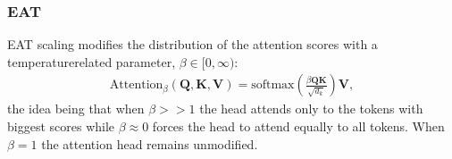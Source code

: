 \documentclass[letterpaper,10pt,english]{sphinxmanual}
\begin{document}
\subsubsection{EAT}
\label{\detokenize{algorithms_intraprocessors:eat}}\label{\detokenize{algorithms_intraprocessors:id2}}
\sphinxAtStartPar
EAT scaling  modifies the distribution of the attention scores with a temperature\sphinxhyphen{}related parameter,
\(\beta \in [0, \infty)\):
\begin{equation*}
\begin{split}\text{Attention}_{\beta} (\mathbf{Q}, \mathbf{K}, \mathbf{V}) = \text{softmax} \left(\frac{\beta \mathbf{Q} \mathbf{K}}{\sqrt{d_k}} \right) \mathbf{V},\end{split}
\end{equation*}
\sphinxAtStartPar
the idea being that when \(\beta >> 1\) the head attends only to the tokens with biggest scores while \(\beta \approx 0\) forces the head to attend equally to all tokens.
When \(\beta = 1\) the attention head remains unmodified.
\end{document}

